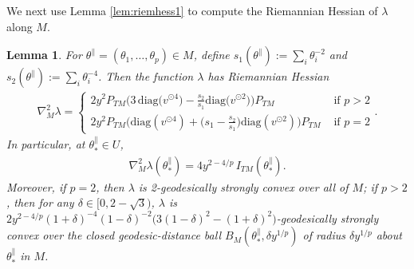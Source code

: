 \documentclass{article}
\newcommand{\tpa}{\theta^{\parallel}}
\theoremstyle{plain}
\newtheorem{lemma}[theorem]{Lemma}
\theoremstyle{definition}
\theoremstyle{remark}
\begin{document}
We next use Lemma \ref{lem:riemhess1} to compute the Riemannian Hessian of $\lambda$ along $M$.

\begin{lemma}\label{lem:examplehessian}
    For $\tpa = (\theta_1,\dots,\theta_p)\in M$, define $s_1(\tpa):=\sum_i\theta_i^{-2}$ and $s_2(\tpa):=\sum_i\theta_i^{-4}$. Then the function $\lambda$ has Riemannian Hessian
    \begin{align}
        \nabla^2_M\lambda =\begin{cases}2y^2P_{TM}\bigg(3\,\text{diag}\big(v^{\odot 4}\big) - \frac{s_2}{s_1}\text{diag}\big(v^{\odot 2}\big)\bigg)P_{TM}&\text{ if $p>2$}\\ 2y^2P_{TM}\bigg(\text{diag}(v^{\odot 4}) + \bigg(s_1-\frac{s_2}{s_1}\bigg)\text{diag}(v^{\odot 2})\bigg)P_{TM}&\text{ if $p=2$}\end{cases}.
    \end{align}
    In particular, at $\tpa_*\in U$,
    \begin{align}
        \nabla^2_M\lambda(\tpa_*) = 4y^{2-4/p}\,I_{TM}(\tpa_*).
    \end{align}
    Moreover, if $p=2$, then $\lambda$ is 2-geodesically strongly convex over all of $M$; if $p>2$, then for any $\delta\in[0,2-\sqrt{3})$, $\lambda$ is $2y^{2-4/p}(1+\delta)^{-4}(1-\delta)^{-2}\big(3(1-\delta)^2-(1+\delta)^2\big)$-geodesically strongly convex over the closed geodesic-distance ball $B_M(\tpa_*,\delta y^{1/p})$ of radius $\delta y^{1/p}$ about $\tpa_*$ in $M$.
\end{lemma}
\end{document}
